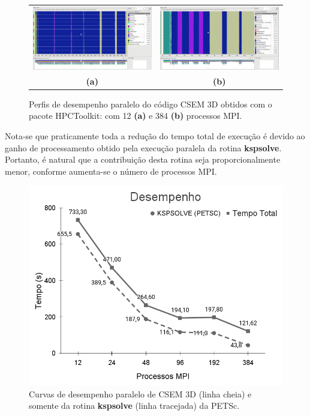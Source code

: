 \documentclass[12pt]{article}
\begin{document}
\begin{figure}[hb]
\centering
\begin{tabular}{cc}
\includegraphics[width=.5\textwidth]{figures/openmpi/Nodes1_MPI12.png} & \includegraphics[width=.5\textwidth]{figures/openmpi/Nodes16_MPI384.png} \\
 \textbf{(a)} & \textbf{(b)} 
\end{tabular}
\caption{Perfis de desempenho paralelo do código CSEM 3D obtidos com o pacote HPCToolkit: com 12 \textbf{(a)} e 384 \textbf{(b)} processos MPI.}
\label{fig:nodesresults}
\end{figure}

Nota-se que praticamente toda a redução do tempo total de execução é devido ao ganho de processamento obtido pela execução paralela da rotina {\ttfamily \textbf{kspsolve}}. Portanto, é natural que a contribuição desta rotina seja proporcionalmente menor, conforme aumenta-se o número de processos MPI.

\begin{figure}[ht]
\centering
\includegraphics[width=.5\textwidth]{figures/openmpi/desempenho.png}
\caption{Curvas de desempenho paralelo de CSEM 3D (linha cheia) e somente da rotina {\ttfamily \textbf{kspsolve}} (linha tracejada) da PETSc. }
\label{fig:desempenho}
\end{figure}
\end{document}
